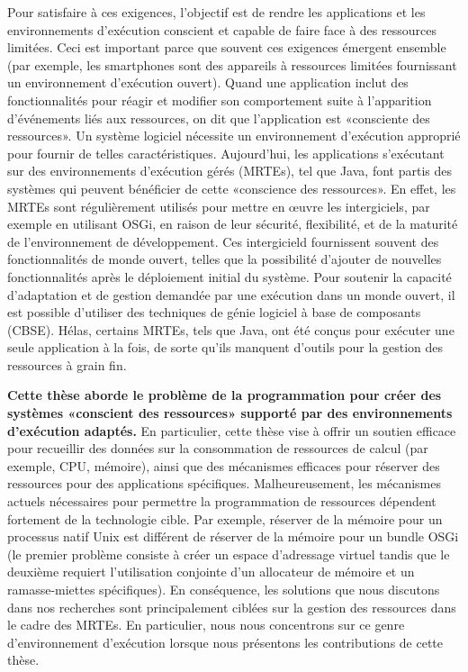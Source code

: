 Pour satisfaire à ces exigences, l'objectif est de rendre les applications et les environnements d'exécution conscient et capable de faire face à des ressources limitées. Ceci est important parce que souvent ces exigences émergent ensemble (par exemple, les smartphones sont des appareils à ressources limitées fournissant un environnement d'exécution ouvert). Quand une application inclut des fonctionnalités pour réagir et modifier son comportement suite à l’apparition d’événements liés aux ressources, on dit que l’application est «consciente des ressources». Un système logiciel nécessite un environnement d'exécution approprié pour fournir de telles caractéristiques. Aujourd'hui, les applications s'exécutant sur des environnements d'exécution gérés (MRTEs), tel que Java, font partis des systèmes qui peuvent bénéficier de cette «conscience des ressources». En effet, les MRTEs sont régulièrement utilisés pour mettre en œuvre les intergiciels, par exemple en utilisant OSGi, en raison de leur sécurité, flexibilité, et de la maturité de l'environnement de développement. Ces intergicield fournissent souvent des fonctionnalités de monde ouvert, telles que la possibilité d'ajouter de nouvelles fonctionnalités après le déploiement initial du système. Pour soutenir la capacité d'adaptation et de gestion demandée par une exécution dans un monde ouvert, il est possible d'utiliser des techniques de génie logiciel à base de composants (CBSE). Hélas, certains MRTEs, tels que Java, ont été conçus pour exécuter une seule application à la fois, de sorte qu'ils manquent d’outils pour la gestion des ressources à grain fin.

\textbf{Cette thèse aborde le problème de la programmation pour créer des systèmes «conscient des ressources» supporté par des environnements d'exécution adaptés.} En particulier, cette thèse vise à offrir un soutien efficace pour recueillir des données sur la consommation de ressources de calcul (par exemple, CPU, mémoire), ainsi que des mécanismes efficaces pour réserver des ressources pour des applications spécifiques. Malheureusement, les mécanismes actuels nécessaires pour permettre la programmation de ressources dépendent fortement de la technologie cible. Par exemple, réserver  de la mémoire pour un processus natif Unix est différent de réserver de la mémoire pour un bundle OSGi (le premier problème consiste à créer un espace d'adressage virtuel tandis que le deuxième requiert l'utilisation conjointe d'un allocateur de mémoire et un ramasse-miettes spécifiques). En conséquence, les solutions que nous discutons dans nos recherches sont principalement ciblées sur la gestion des ressources dans le cadre des MRTEs. En particulier, nous nous concentrons sur ce genre d'environnement d'exécution lorsque nous présentons les contributions de cette thèse.

